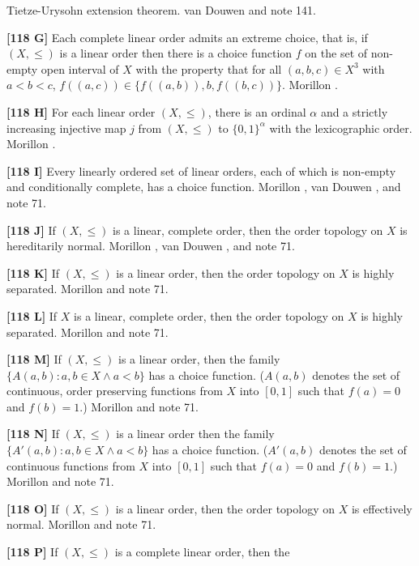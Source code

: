 Tietze-Urysohn extension theorem. van \ac{Douwen} \cite{1985} and
note 141.
\smallskip
\item{}{\bf [118 G]}  Each complete linear order admits an extreme choice,
that is, if $(X,\le)$ is a linear order then there is a choice function $f$
on the set of non-empty open interval of $X$ with the property that for all
$(a,b,c)\in X^3$ with $a < b < c$, $f((a,c))\in\{f((a,b)),b,f((b,c)) \}$.
\ac{Morillon} \cite{1991a}.
\smallskip
\item{}{\bf [118 H]} For each linear order $(X,\le)$, there is an ordinal
$\alpha$ and a strictly increasing injective map $j$ from $(X,\le)$ to
$\{0,1\}^\alpha$ with the lexicographic order.  \ac{Morillon} \cite{1987}.
\smallskip
\item{}{\bf [118 I]}  Every linearly ordered set of linear orders, each
of which is non-empty and conditionally complete, has a choice function.
\ac{Morillon} \cite{1988}, van \ac{Douwen} \cite{1985}, and note 71.
\smallskip
\item{}{\bf [118 J]} If $(X,\le)$ is a linear, complete order, then the
order topology on $X$ is hereditarily normal.  \ac{Morillon} \cite{1988},
van \ac{Douwen} \cite{1985}, and note 71.
\smallskip
\item{}{\bf [118 K]} If $(X,\le)$ is a linear order, then the order
topology on $X$ is highly separated. \ac{Morillon} \cite{1988} and note 71.
\smallskip
\item{}{\bf [118 L]} If $X$ is a linear, complete order, then the order
topology on $X$ is highly separated.  \ac{Morillon} \cite{1988} and note 71.
\smallskip
\item{}{\bf [118 M]} If $(X,\le)$ is a linear order, then the family
$\{A(a,b): a, b\in X \land a< b\}$ has a choice function.  ($A(a,b)$
denotes the set of continuous, order preserving functions from $X$ into
$[0,1]$ such that $f(a)= 0$ and $f(b) = 1$.)  \ac{Morillon} \cite{1988}
and note 71.
\smallskip
\item{}{\bf [118 N]} If $(X,\le)$ is a linear order then the family
$\{A'(a,b): a, b\in X \land a< b\}$ has a choice function. ($A'(a,b)$
denotes the set of continuous functions from $X$ into $[0,1]$ such
that $f(a)= 0$ and $f(b) = 1$.)  \ac{Morillon} \cite{1988} and note 71.
\smallskip
\item{}{\bf [118 O]} If $(X,\le)$ is a linear order, then the order
topology on $X$ is effectively normal.  \ac{Morillon} \cite{1988} and
note 71.
\smallskip
\item{}{\bf [118 P]} If $(X,\le)$ is a complete linear order, then the
